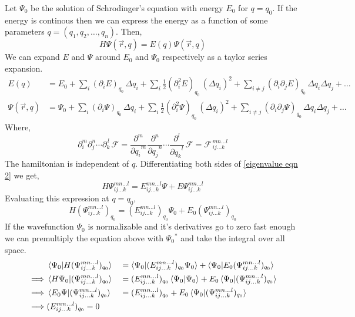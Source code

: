 \documentclass[a4paper, 11pt]{article}
\begin{document}
Let $\Psi_0$ be the solution of Schrodinger's equation with energy $E_0$ for $q = q_0$. If the
energy is continous then we can express the energy as a function of some parameters $q = (q_1, q_2,
\ldots, q_n)$. Then,
\begin{equation}
	H \Psi(\vec{r}, q) = E(q) \Psi(\vec{r}, q) \label{eigenvalue eqn 2}
\end{equation}
We can expand $E$ and $\Psi$ around $E_0$ and $\Psi_0$ respectively as a taylor series expansion.
\begin{align}
	E(q) &= E_0 + \sum_i (\partial_i E)_{q_0} \, \Delta q_i + \sum_i \frac{1}{2} (\partial_i^2
	E)_{q_0} \, (\Delta q_i)^2 + \sum_{i \neq j} (\partial_i \partial_j E)_{q_0} \, \Delta q_i
	\Delta q_j + \ldots \label{taylor series E} \\
	\Psi( \vec{r}, q) &= \Psi_0 + \sum_i (\partial_i \Psi)_{q_0} \, \Delta q_i + \sum_i \frac{1}{2}
	(\partial_i^2 \Psi)_{q_0} \, (\Delta q_i)^2 + \sum_{i \neq j} (\partial_i \partial_j \Psi)_{q_0}
	\, \Delta q_i \Delta q_j + \ldots \label{taylor series Psi}
\end{align}
Where,
\begin{equation}
	\partial_i^m \partial_j^{n} \cdots \partial_k^{\, l} \, \mathcal{F} =
	\frac{\partial^m}{{\partial q_i}^m} \frac{\partial^n}{{\partial q_j}^n} \cdots
	\frac{\partial^l}{{\partial q_k}^l} \, \mathcal{F} = \mathcal{F}_{\, i j \ldots k}^{\, m n
	\ldots l}
\end{equation}
The hamiltonian is independent of $q$. Differentiating both sides of \eqref{eigenvalue eqn 2} we
get,
\begin{equation}
	H \Psi_{i j \ldots k}^{m n \ldots l} = E_{i j \ldots k}^{m n \ldots l} \Psi + E
	\Psi_{i j \ldots k}^{m n \ldots l}
\end{equation}
Evaluating this expression at $q = q_0$,
\begin{equation}
	H (\Psi_{i j \ldots k}^{m n \ldots l})_{q_0} = (E_{i j \ldots k}^{m n \ldots l})_{q_0} \Psi_0 +
	E_0 (\Psi_{i j \ldots k}^{m n \ldots l})_{q_0}
	\label{differentiating eigenvalue equation at q_0}
\end{equation}
If the wavefunction $\Psi_0$ is normalizable and it's derivatives go to zero fast enough we can
premultiply the equation above with ${\Psi_0}^*$ and take the integral over all space.
\begin{alignat*}{2}
	&\braket{ \Psi_0 | H (\Psi_{i j \ldots k}^{m n \ldots l})_{q_0} } &&= \braket{ \Psi_0 | (E_{i j
	\ldots k}^{m n \ldots l})_{q_0} \Psi_0 } + \braket{ \Psi_0 | E_0 (\Psi_{i j \ldots k}^{m n
	\ldots l})_{q_0} } \\
	\implies &\braket{ H \Psi_0 | (\Psi_{i j \ldots k}^{m n \ldots l})_{q_0} } &&= (E_{i j \ldots
	k}^{m n \ldots l})_{q_0} \braket{ \Psi_0 | \Psi_0 } + E_0 \braket{ \Psi_0 | (\Psi_{i j \ldots
	k}^{m n \ldots l})_{q_0} } \\
	\implies &\braket{ E_0 \Psi | (\Psi_{i j \ldots k}^{m n \ldots l})_{q_0} } &&= (E_{i j \ldots
	k}^{m n \ldots l})_{q_0} + E_0 \braket{ \Psi_0 | (\Psi_{i j \ldots k}^{m n \ldots l})_{q_0} } \\
	\implies &(E_{i j \ldots k}^{m n \ldots l})_{q_0} = 0
\end{alignat*}
\end{document}
